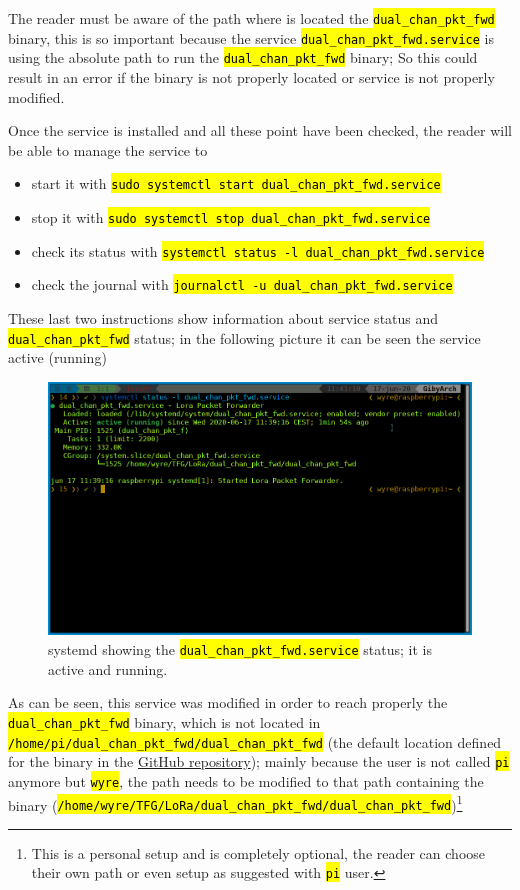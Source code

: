 \documentclass[11pt,a4paper,dvipsnames,twoside]{article}
\newcommand{\cmd}[1] {\hl{\texttt{#1}}}
\begin{document}
The reader must be aware of the path where is located the \cmd{dual\_chan\_pkt\_fwd} binary, this is so important because the service \cmd{dual\_chan\_pkt\_fwd.service} is using the absolute path to run the \cmd{dual\_chan\_pkt\_fwd} binary; So this could result in an error if the binary is not properly located or service is not properly modified.

Once the service is installed and all these point have been checked, the reader will be able to manage the service to

\begin{itemize}
  \item start it with \cmd{sudo systemctl start dual\_chan\_pkt\_fwd.service}
  \item stop it with \cmd{sudo systemctl stop dual\_chan\_pkt\_fwd.service}
  \item check its status with \cmd{systemctl status -l dual\_chan\_pkt\_fwd.service}
  \item check the journal with \cmd{journalctl -u dual\_chan\_pkt\_fwd.service}
\end{itemize}

These last two instructions show information about service status and \cmd{dual\_chan\_pkt\_fwd} status; in the following picture it can be seen the service active (running)

\begin{figure}[ht]
  \centering
  \includegraphics[width=.82\textwidth]{../pictures/pkt_fwd-service.png}
  \caption{systemd showing the \cmd{dual\_chan\_pkt\_fwd.service} status; it is active and running.}
  \label{fig:dual_chan_pkt_fwd-status}
\end{figure}

As can be seen, this service was modified in order to reach properly the \cmd{dual\_chan\_pkt\_fwd} binary, which is not located in \cmd{/home/pi/dual\_chan\_pkt\_fwd/dual\_chan\_pkt\_fwd} (the default location defined for the binary in the \href{https://github.com/dragino/dual_chan_pkt_fwd/blob/master/dual_chan_pkt_fwd.service#L9}{GitHub repository}); mainly because the user is not called \cmd{pi} anymore but \cmd{wyre}, the path needs to be modified to that path containing the binary (\cmd{/home/wyre/TFG/LoRa/dual\_chan\_pkt\_fwd/dual\_chan\_pkt\_fwd})\footnote{This is a personal setup and is completely optional, the reader can choose their own path or even setup as suggested with \cmd{pi} user.}
\end{document}

